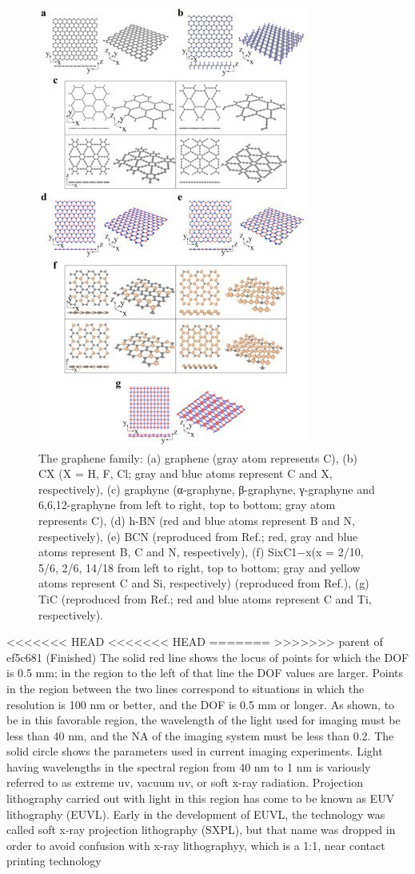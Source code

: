 \documentclass[12pt,a4paper]{report}
\begin{document}
\begin{figure}
  \centering
  \includegraphics[scale=0.3]{2.1.jpg}
  \caption{The graphene family: (a) graphene (gray atom represents C), (b) CX (X = H, F, Cl; gray and blue atoms represent C and X, respectively), (c) graphyne (α-graphyne, β-graphyne, γ-graphyne and 6,6,12-graphyne from left to right, top to bottom; gray atom represents C), (d) h-BN (red and blue atoms represent B and N, respectively), (e) BCN (reproduced from Ref.; red, gray and blue atoms represent B, C and N, respectively), (f) SixC1−x(x = 2/10, 5/6, 2/6, 14/18 from left to right, top to bottom; gray and yellow atoms represent C and Si, respectively) (reproduced from Ref.), (g) TiC (reproduced from Ref.; red and blue atoms represent C and Ti, respectively).}
  \label{graphenefam}
  \end{figure}

<<<<<<< HEAD
<<<<<<< HEAD
=======
>>>>>>> parent of ef5c681 (Finished)
  The solid red line shows the locus of points for which the
DOF is 0.5 mm; in the region to the left of that line the
DOF values are larger. Points in the region between the
two lines correspond to situations in which the resolution
is 100 nm or better, and the DOF is 0.5 mm or longer. As
shown, to be in this favorable region, the wavelength of
the light used for imaging must be less than 40 nm, and
the NA of the imaging system must be less than 0.2. The
solid circle shows the parameters used in current imaging
experiments. Light having wavelengths in the spectral
region from 40 nm to 1 nm is variously referred to as
extreme uv, vacuum uv, or soft x-ray radiation.
Projection lithography carried out with light in this
region has come to be known as EUV lithography
(EUVL). Early in the development of EUVL, the
technology was called soft x-ray projection lithography
(SXPL), but that name was dropped in order to avoid
confusion with x-ray lithographyy, which is a 1:1, 
near contact printing technology
\end{document}
